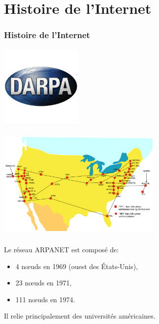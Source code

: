 \documentclass[svgnames,11pt]{beamer}
\begin{document}
\section{Histoire de l'Internet}
\begin{frame}
    \frametitle{Histoire de l'Internet}

    \begin{center}
        \centering
        \includegraphics[width=4cm]{ressources/darpa.png}
        \label{IMG}
    \end{center}

\end{frame}
\begin{frame}
    \frametitle{}

    \begin{center}
        \centering
        \includegraphics[width=8cm]{ressources/arpanet.png}
        \label{IMG}
    \end{center}

\end{frame}
\begin{frame}
    \frametitle{}

    \begin{aretenir}[]
        Le réseau ARPANET est composé de:
        \begin{itemize}
            \item 4 nœuds en 1969 (ouest des États-Unis),
            \item 23 nœuds en 1971,
            \item 111 nœuds en 1974.
        \end{itemize}
        Il relie principalement des universités américaines.
    \end{aretenir}

\end{frame}
\end{document}
